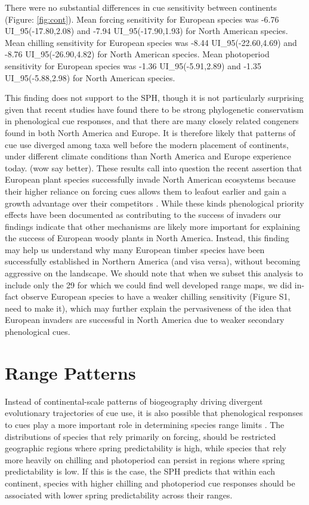 \documentclass[12pt]{article}
\begin{document}
There were no substantial differences in cue sensitivity between continents (Figure: \ref{fig:cont}). Mean forcing sensitivity for European species was -6.76 UI_{95}(-17.80,2.08)  and -7.94 UI_{95}(-17.90,1.93) for North American species. Mean chilling sensitivity for European species was -8.44 UI_{95}(-22.60,4.69) and -8.76 UI_{95}(-26.90,4.82) for North American species. Mean photoperiod sensitivity for European species was -1.36 UI_{95}(-5.91,2.89) and -1.35 UI_{95}(-5.88,2.98) for North American species.

This finding does not support to the SPH, though it is not particularly surprising given that recent studies have found there to be strong phylogenetic conservatism in phenological cue responses, and that there are many closely related congeners found in both North America and Europe. It is therefore likely that patterns of cue use diverged among taxa well before the modern placement of continents, under different climate conditions than North America and Europe experience today. (wow say better). These results call into question the recent assertion that European plant species successfully invade North American ecosystems because their higher reliance on forcing cues allows them to leafout earlier and gain a growth advantage over their competitors \citep{Dawson2025}. While these kinds phenological priority effects have been documented as contributing to the success of invaders \citep{Buonaiuto:2023wy,Alexander2019} our findings indicate that other mechanisms are likely more important for explaining the success of European woody plants in North America. Instead, this finding may help us understand why many European timber species have been successfully established in Northern America (and visa versa), without becoming aggressive on the landscape. We should note that when we subset this analysis to include only the 29 for which we could find well developed range maps, we did in-fact observe European species to have a weaker chilling sensitivity (Figure S1, need to make it), which may further explain the pervasiveness of the idea that European invaders are successful in North America due to weaker secondary phenological cues.

\section*{Range Patterns}
Instead of continental-scale patterns of biogeography driving divergent evolutionary trajectories of cue use, it is also possible that phenological responses to cues play a more important role in determining species range limits \citep{Chuine2010}. The distributions of species that rely primarily on forcing, should be restricted geographic regions where spring predictability is high, while species that rely more heavily on chilling and photoperiod can persist in regions where spring predictability is low. If this is the case, the SPH predicts that within each continent, species with higher chilling and photoperiod cue responses should be associated with lower spring predictability across their ranges.
\end{document}
